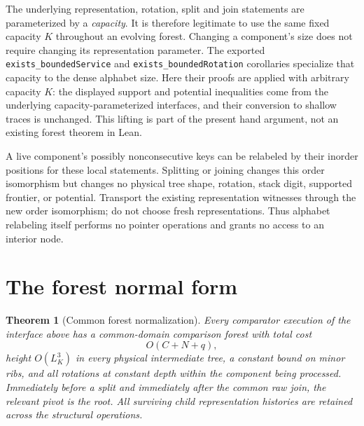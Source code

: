 \documentclass[11pt]{article}
\newtheorem{theorem}{Theorem}
\begin{document}
The underlying representation, rotation, split and join statements are
parameterized by a \emph{capacity}. It is therefore legitimate to use the
same fixed capacity $K$ throughout an evolving forest. Changing a
component's size does not require changing its representation parameter.
The exported \texttt{exists\_boundedService} and
\texttt{exists\_boundedRotation} corollaries specialize that capacity to
the dense alphabet size. Here their proofs are applied with arbitrary
capacity $K$: the displayed support and potential inequalities come from
the underlying capacity-parameterized interfaces, and their conversion
to shallow traces is unchanged. This lifting is part of the present
hand argument, not an existing forest theorem in Lean.

A live component's possibly nonconsecutive keys can be relabeled by
their inorder positions for these local statements. Splitting or joining
changes this order isomorphism but changes no physical tree shape,
rotation, stack digit, supported frontier, or potential. Transport the
existing representation witnesses through the new order isomorphism;
do not choose fresh representations. Thus alphabet relabeling itself
performs no pointer operations and grants no access to an interior node.

\section{The forest normal form}

\begin{theorem}[Common forest normalization]\label{thm:normal}
Every comparator execution of the interface above has a common-domain
comparison forest with total cost
\[
 O(C+N+q),
\]
height $O(L_K^3)$ in every physical intermediate tree, a constant bound
on minor ribs, and all rotations at constant depth within the component
being processed. Immediately before a split and immediately after the
common raw join, the relevant pivot is the root. All surviving child
representation histories are retained across the structural operations.
\end{theorem}
\end{document}
